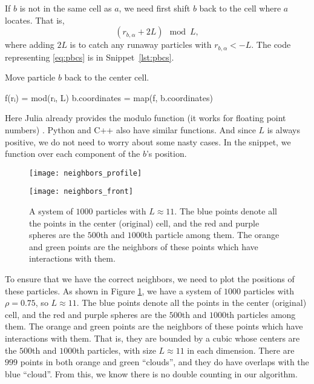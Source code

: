 If \(b\) is not in the same cell as \(a\), we need first shift \(b\) back to the cell where
\(a\) locates. That is,
%
\begin{equation}\label{eq:pbcs}
    (r_{b, \alpha} + 2L) \mod L,
\end{equation}
%
where adding \(2L\) is to catch any runaway particles\cite{Adrian} with \(r_{b, \alpha} < -L\).
The code representing \eqref{eq:pbcs} is in Snippet~\ref{lst:pbcs}.
%
\begin{algorithm}
    \caption{Move particle \(b\) back to the center cell.}
    \label{lst:pbcs}
    \begin{juliacode}
        f(rᵢ) = mod(rᵢ, L)
        b.coordinates = map(f, b.coordinates)
    \end{juliacode}
\end{algorithm}
%
Here Julia already provides the modulo function (it works for floating point numbers)
\href{https://docs.julialang.org/en/v1/base/math/#Base.mod}{}. Python and C++
also have similar functions. And since \(L\) is always positive, we do not need to worry
about some nasty cases.
In the snippet, we  function  over
each component of the \(b\)'s position.

\begin{figure} %
    \centering
    \begin{minipage}[t]{0.5\linewidth}
        \centering
        \texttt{[image: neighbors\_profile]}
        \label{fig:neighbors:a}
    \end{minipage}
    \hfill
    \begin{minipage}[t]{0.5\linewidth}
        \centering
        \texttt{[image: neighbors\_front]}
        \label{fig:neighbors:b}
    \end{minipage}
    \caption{A system of \(1000\) particles with \(L \approx 11\). The blue points denote all
        the points in the center (original) cell, and the red and purple spheres are the
        \(500\)th and \(1000\)th particle among them. The orange and green points are the
        neighbors of these points which have interactions with them.}
    \label{fig:neighbors}
\end{figure}

To ensure that we have the correct neighbors, we need to plot the positions of these particles.
As shown in Figure \ref{fig:neighbors}, we have a system of \(1000\) particles with
\(\rho = 0.75\), so \(L \approx 11\). The blue points denote all
the points in the center (original) cell, and the red and purple spheres are the
\(500\)th and \(1000\)th particles among them. The orange and green points are the
neighbors of these points which have interactions with them. That is, they are bounded by a
cubic whose centers are the \(500\)th and \(1000\)th particles,
with size \(L \approx 11\) in each dimension.
There are \(999\) points in both orange and green ``clouds'', and they do have overlaps
with the blue ``cloud''. From this, we know there is no double counting in our algorithm.

